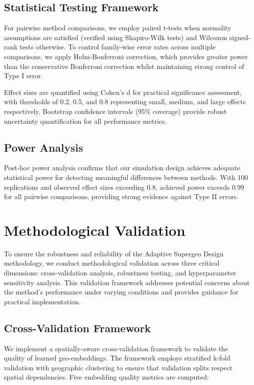 \documentclass[final,3p,fleqn, 10pt]{elsarticle}
\begin{document}
\subsection{Statistical Testing Framework}

For pairwise method comparisons, we employ paired t-tests when normality assumptions are satisfied (verified using Shapiro-Wilk tests) and Wilcoxon signed-rank tests otherwise. To control family-wise error rates across multiple comparisons, we apply Holm-Bonferroni correction, which provides greater power than the conservative Bonferroni correction whilst maintaining strong control of Type I error.

Effect sizes are quantified using Cohen's d for practical significance assessment, with thresholds of 0.2, 0.5, and 0.8 representing small, medium, and large effects respectively. Bootstrap confidence intervals (95\% coverage) provide robust uncertainty quantification for all performance metrics.

\subsection{Power Analysis}

Post-hoc power analysis confirms that our simulation design achieves adequate statistical power for detecting meaningful differences between methods. With 100 replications and observed effect sizes exceeding 0.8, achieved power exceeds 0.99 for all pairwise comparisons, providing strong evidence against Type II errors.

\section{Methodological Validation}
\label{sec:methodological_validation}

To ensure the robustness and reliability of the Adaptive Supergeo Design methodology, we conduct methodological validation across three critical dimensions: cross-validation analysis, robustness testing, and hyperparameter sensitivity analysis. This validation framework addresses potential concerns about the method's performance under varying conditions and provides guidance for practical implementation.

\subsection{Cross-Validation Framework}

We implement a spatially-aware cross-validation framework to validate the quality of learned geo-embeddings. The framework employs stratified k-fold validation with geographic clustering to ensure that validation splits respect spatial dependencies. Five embedding quality metrics are computed:
\end{document}
